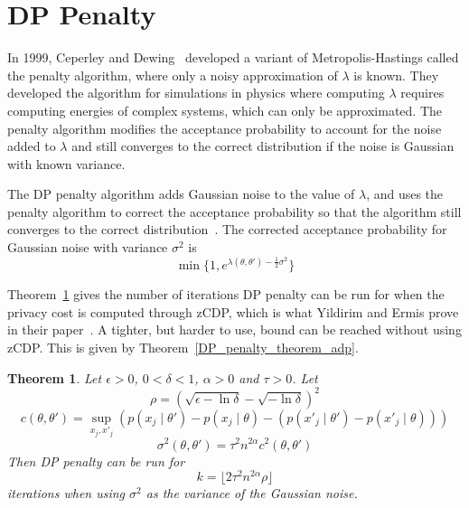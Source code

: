 \documentclass[english,twoside,openright]{HYgraduMLDS}
\newtheorem{theorem}{Theorem}
\begin{document}
\section{DP Penalty}

In 1999, Ceperley and Dewing~\cite{CeD99} developed a variant of 
Metropolis-Hastings called the penalty 
algorithm, where only a noisy approximation of \(\lambda\) is known. They 
developed the algorithm for simulations in physics where computing \(\lambda\)
requires computing energies of complex systems, which can only be approximated.
The penalty algorithm modifies the acceptance probability to account for the 
noise added to \(\lambda\) and still converges to the correct distribution if 
the noise is Gaussian with known variance.

The DP penalty algorithm adds Gaussian noise to the value of \(\lambda\), and 
uses the penalty algorithm to correct the acceptance probability so that 
the algorithm still converges to the correct distribution~\cite{YildirimE19}.
The corrected acceptance probability for Gaussian noise with variance 
\(\sigma^2\) is 
\[
    \min\{1, e^{\lambda(\theta, \theta') - \frac{1}{2}\sigma^2}\}
\]

Theorem~\ref{DP_penalty_theorem_zcdp} gives the number of iterations DP penalty 
can be run for when the privacy cost is computed through zCDP, which is 
what Yildirim and Ermis prove in their paper~\cite{YildirimE19}. A tighter, but 
harder to use, bound can be reached without using zCDP. This is given by 
Theorem~\ref{DP_penalty_theorem_adp}.

\begin{theorem}\label{DP_penalty_theorem_zcdp}
    Let \(\epsilon > 0\), \(0 < \delta < 1\), \(\alpha > 0\) and \(\tau > 0\).
    Let
    \[
        \rho = (\sqrt{\epsilon - \ln \delta} - \sqrt{-\ln \delta})^2
    \]
    \[
        c(\theta, \theta') = \sup_{x_j, x'_j} (p(x_j\mid \theta') - p(x_j\mid \theta) 
        - (p(x'_j\mid \theta') - p(x'_j\mid \theta)))
    \]
    \[
        \sigma^2(\theta, \theta') = \tau^2 n^{2\alpha}c^2(\theta, \theta')
    \]
    Then DP penalty can be run for 
    \[
        k = \lfloor 2\tau^2 n^{2\alpha} \rho\rfloor
    \]
    iterations when using \(\sigma^2\) as the variance of the Gaussian noise.
\end{theorem}
\end{document}

